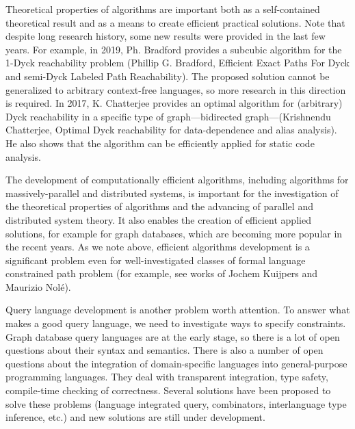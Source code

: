 \documentclass[12pt]{article}  %
\theoremstyle{remark}
\begin{document}
Theoretical properties of algorithms are important both as a self-contained theoretical result and as a means to create efficient practical solutions.
Note that despite long research history, some new results were provided in the last few years. 
For example, in 2019, Ph. Bradford provides a subcubic algorithm for the 1-Dyck reachability problem (Phillip G. Bradford, Efficient Exact Paths For Dyck and semi-Dyck Labeled Path Reachability). 
The proposed solution cannot be generalized to arbitrary context-free languages, so more research in this direction is required.
In 2017, K. Chatterjee provides an optimal algorithm for (arbitrary) Dyck reachability in a specific type of graph---bidirected graph---(Krishnendu Chatterjee, Optimal Dyck reachability for data-dependence and alias analysis). 
He also shows that the algorithm can be efficiently applied for static code analysis.

The development of computationally efficient algorithms, including algorithms for massively-parallel and distributed systems, is important for the investigation of the theoretical properties of algorithms and the advancing of parallel and distributed system theory.
It also enables the creation of efficient applied solutions, for example for graph databases, which are becoming more popular in the recent years. 
As we note above, efficient algorithms development is a significant problem even for well-investigated classes of formal language constrained path problem (for example, see works of Jochem Kuijpers and Maurizio Nolé).

Query language development is another problem worth attention. 
To answer what makes a good query language, we need to investigate ways to specify constraints. 
Graph database query languages are at the early stage, so there is a lot of open questions about their syntax and semantics.
There is also a number of open questions about the integration of domain-specific languages into general-purpose programming languages. 
They deal with transparent integration, type safety, compile-time checking of correctness. 
Several solutions have been proposed to solve these problems (language integrated query, combinators, interlanguage type inference, etc.) and new solutions are still under development.
\end{document}
